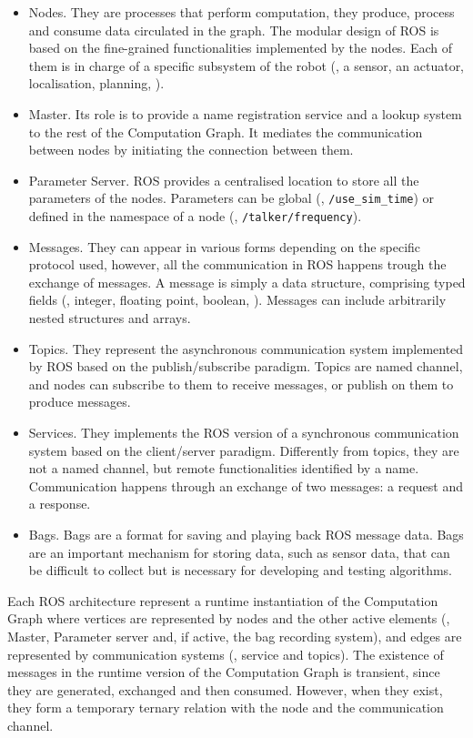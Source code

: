 \begin{itemize}
\item Nodes. They are processes that perform computation, they produce, process and consume data circulated in the graph. The modular design of ROS is based on the fine-grained functionalities implemented by the nodes. Each of them is in charge of a specific subsystem of the robot (\eg, a sensor, an actuator, localisation, planning, \etc). 
\item Master. Its role is to provide a name registration service and a lookup system to the rest of the Computation Graph. It mediates the communication between nodes by initiating the connection between them. 
\item Parameter Server. ROS provides a centralised location to store all the parameters of the nodes. Parameters can be global (\eg, \texttt{/use\_sim\_time}) or defined in the namespace of a node (\eg, \texttt{/talker/frequency}).
\item Messages. They can appear in various forms depending on the specific protocol used, however, all the communication in ROS happens trough the exchange of messages. A message is simply a data structure, comprising typed fields (\eg, integer, floating point, boolean, \etc). Messages can include arbitrarily nested structures and arrays.
\item Topics. They represent the asynchronous communication system implemented by ROS based on the publish/subscribe paradigm. Topics are named channel, and nodes can subscribe to them to receive messages, or publish on them to produce messages.
\item Services. They implements the ROS version of a synchronous communication system based on the client/server paradigm. Differently from topics, they are not a named channel, but remote functionalities identified by a name. Communication happens through an exchange of two messages: a request and a response.
\item Bags. Bags are a format for saving and playing back ROS message data. Bags are an important mechanism for storing data, such as sensor data, that can be difficult to collect but is necessary for developing and testing algorithms. 
\end{itemize}

Each ROS architecture represent a runtime instantiation of the Computation Graph where vertices are represented by nodes and the other active elements (\ie, Master, Parameter server and, if active, the bag recording system), and edges are represented by communication systems (\ie, service and topics). The existence of messages in the runtime version of the Computation Graph is transient, since they are generated, exchanged and then consumed. However, when they exist, they form a temporary ternary relation with the node and the communication channel.

